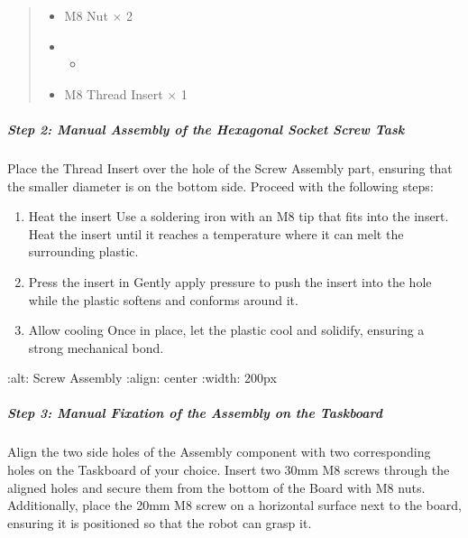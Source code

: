 \documentclass[letterpaper,10pt,english]{sphinxmanual}
\begin{document}
\begin{quote}
\begin{itemize}
\end{itemize}
\begin{itemize}
\item {} 
\sphinxAtStartPar
M8 Nut × 2

\end{itemize}
\begin{itemize}
\item {} \begin{itemize}
\item {} 
\end{itemize}

\end{itemize}
\begin{itemize}
\item {} 
\sphinxAtStartPar
M8 Thread Insert × 1

\end{itemize}
\end{quote}


\subparagraph{Step 2: Manual Assembly of the Hexagonal Socket Screw Task}
\label{\detokenize{4-Assembly-Instructions-Screws-and-Nuts:step-2-manual-assembly-of-the-hexagonal-socket-screw-task}}
\sphinxAtStartPar
Place the Thread Insert over the hole of the Screw Assembly part, ensuring that the smaller diameter is on the bottom side.
Proceed with the following steps:
\begin{enumerate}
%
\item {} 
\sphinxAtStartPar
Heat the insert \textendash{} Use a soldering iron with an M8 tip that fits into the insert. Heat the insert until it reaches a temperature where it can melt the surrounding plastic.

\item {} 
\sphinxAtStartPar
Press the insert in \textendash{} Gently apply pressure to push the insert into the hole while the plastic softens and conforms around it.

\item {} 
\sphinxAtStartPar
Allow cooling \textendash{} Once in place, let the plastic cool and solidify, ensuring a strong mechanical bond.

\end{enumerate}

\noindent{}

\sphinxAtStartPar
    :alt: Screw Assembly
    :align: center
    :width: 200px


\subparagraph{Step 3: Manual Fixation of the Assembly on the Taskboard}
\label{\detokenize{4-Assembly-Instructions-Screws-and-Nuts:step-3-manual-fixation-of-the-assembly-on-the-taskboard}}
\sphinxAtStartPar
Align the two side holes of the Assembly component with two corresponding holes on the Taskboard of your choice. Insert two 30mm M8 screws through the aligned holes and secure them from the bottom of the Board with M8 nuts.
Additionally, place the 20mm M8 screw on a horizontal surface next to the board, ensuring it is positioned so that the robot can grasp it.
\end{document}
